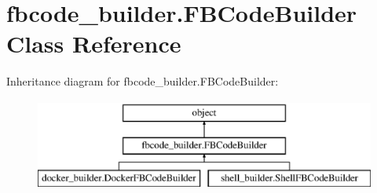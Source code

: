 \section{fbcode\+\_\+builder.\+F\+B\+Code\+Builder Class Reference}
\label{classfbcode__builder_1_1FBCodeBuilder}
Inheritance diagram for fbcode\+\_\+builder.\+F\+B\+Code\+Builder\+:\begin{figure}[H]
\begin{center}
\leavevmode
\includegraphics[height=3.000000cm]{classfbcode__builder_1_1FBCodeBuilder}
\end{center}
\end{figure}
